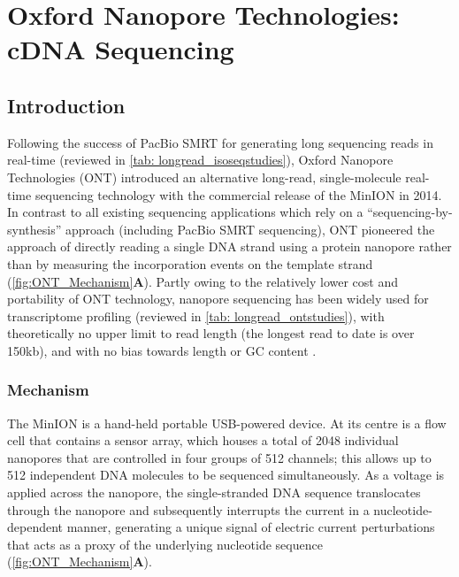 \clearpage

\section{Oxford Nanopore Technologies: cDNA Sequencing}
\label{sec:ONT_cDNA_Sequencing}

\subsection{Introduction}
Following the success of PacBio SMRT for generating long sequencing reads in real-time (reviewed in \cref{tab: longread_isoseqstudies}), Oxford Nanopore Technologies (ONT) introduced an alternative long-read, single-molecule real-time sequencing technology with the commercial release of the MinION in 2014. In contrast to all existing sequencing applications which rely on a “sequencing-by-synthesis” approach (including PacBio SMRT sequencing), ONT pioneered the approach of directly reading a single DNA strand using a protein nanopore rather than by measuring the incorporation events on the template strand\cite{Jain2015} (\cref{fig:ONT_Mechanism}\textbf{A}). Partly owing to the relatively lower cost and portability of ONT technology, nanopore sequencing has been widely used for transcriptome profiling (reviewed in \cref{tab: longread_ontstudies}), 
with theoretically no upper limit to read length \cite{Loman2015} (the longest read to date is over 150kb), and with no bias towards length or GC content \cite{Oikonomopoulos2016, Weirather2017}.


\subsubsection{Mechanism}
The MinION is a hand-held portable USB-powered device. At its centre is a flow cell that contains a sensor array, which houses a total of 2048 individual nanopores that are controlled in four groups of 512 channels; this allows up to 512 independent DNA molecules to be sequenced simultaneously\cite{Jain2015}. As a voltage is applied across the nanopore, the single-stranded DNA sequence translocates through the nanopore and subsequently interrupts the current in a nucleotide-dependent manner, generating a unique signal of electric current perturbations that acts as a proxy of the underlying nucleotide sequence (\cref{fig:ONT_Mechanism}\textbf{A}). 

